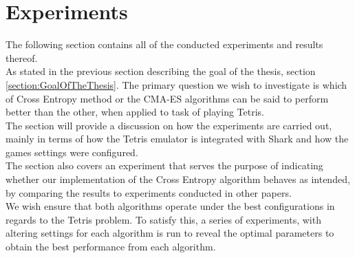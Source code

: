 \section{Experiments}
The following section contains all of the conducted experiments and results thereof.\\
As stated in the previous section describing the goal of the thesis, section
\ref{section:GoalOfTheThesis}. The primary question we wish to investigate is which of
Cross Entropy method or the CMA-ES algorithms can be said to perform better
than the other, when applied to task of playing Tetris.\\
The section will provide a discussion on how the experiments are carried out, mainly
in terms of how the Tetris emulator is integrated with Shark and how the games settings were configured.\\
The section also covers an experiment that serves the purpose of indicating whether our implementation 
of the Cross Entropy algorithm behaves as intended, by comparing the results to experiments
conducted in other papers. \\
We wish ensure that both algorithms operate under the 
best configurations in regards to the Tetris problem. To satisfy this, a series of experiments, with altering settings for each 
algorithm is run to reveal the optimal parameters to obtain the best performance from 
each algorithm. 
















